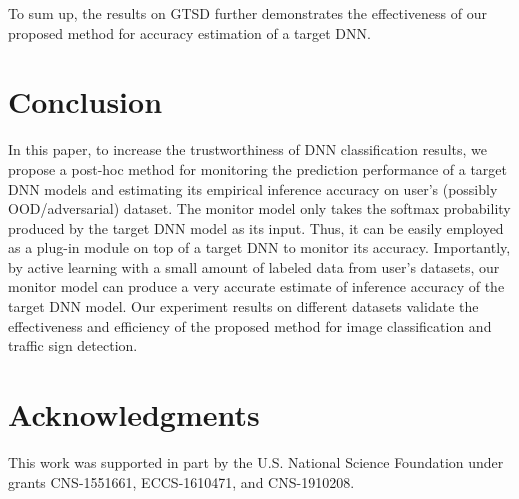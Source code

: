 \documentclass{article}
\begin{document}
To sum up, the results on GTSD further demonstrates the effectiveness of our proposed method for accuracy estimation of a target DNN.

 \section{Conclusion}
{In this paper, to increase
the trustworthiness of DNN classification results,
we propose a post-hoc method for monitoring the prediction performance of a target DNN models and estimating its empirical inference accuracy
on user's (possibly OOD/adversarial) dataset.}
The monitor model only takes the softmax probability produced by the target DNN model as its input. Thus, it can be easily employed as a plug-in module on top of a target DNN to monitor its accuracy.
Importantly, by active learning with a small amount of labeled data from user's datasets, our monitor model can produce a very accurate estimate of inference accuracy of the target DNN model. Our experiment results on different datasets validate the effectiveness and efficiency of the proposed method for image classification and traffic sign detection.

 

\section*{Acknowledgments}
This work was supported in part by the U.S. National Science Foundation under grants CNS-1551661, ECCS-1610471, and CNS-1910208.


\end{document}
